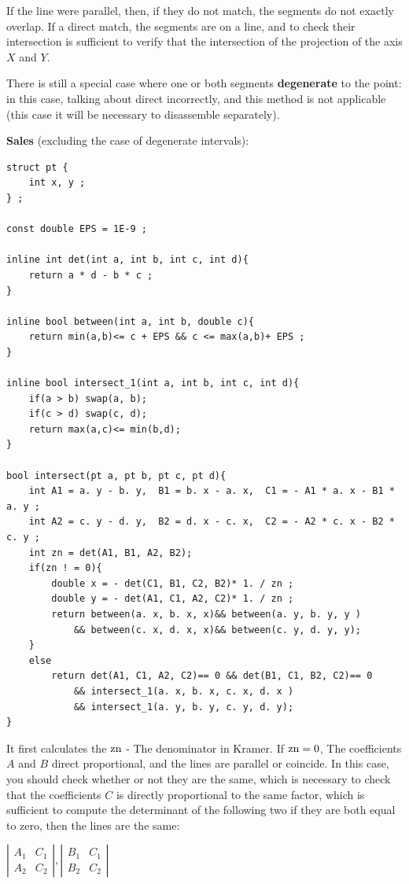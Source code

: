 If the line were parallel, then, if they do not match, the segments do not exactly overlap. If a direct match, the segments are on a line, and to check their intersection is sufficient to verify that the intersection of the projection of the axis $X$ and $Y$.

There is still a special case where one or both segments \textbf{degenerate} to the point: in this case, talking about direct incorrectly, and this method is not applicable (this case it will be necessary to disassemble separately).

\textbf{Sales} (excluding the case of degenerate intervals):

\begin{verbatim}
struct pt {
    int x, y ;
} ;
 
const double EPS = 1E-9 ;
 
inline int det(int a, int b, int c, int d){
    return a * d - b * c ;
}
 
inline bool between(int a, int b, double c){
    return min(a,b)<= c + EPS && c <= max(a,b)+ EPS ;
}
 
inline bool intersect_1(int a, int b, int c, int d){
    if(a > b) swap(a, b);
    if(c > d) swap(c, d);
    return max(a,c)<= min(b,d);
}
 
bool intersect(pt a, pt b, pt c, pt d){
    int A1 = a. y - b. y,  B1 = b. x - a. x,  C1 = - A1 * a. x - B1 * a. y ;
    int A2 = c. y - d. y,  B2 = d. x - c. x,  C2 = - A2 * c. x - B2 * c. y ;
    int zn = det(A1, B1, A2, B2);
    if(zn ! = 0){
        double x = - det(C1, B1, C2, B2)* 1. / zn ;
        double y = - det(A1, C1, A2, C2)* 1. / zn ;
        return between(a. x, b. x, x)&& between(a. y, b. y, y )
            && between(c. x, d. x, x)&& between(c. y, d. y, y);
    }
    else
        return det(A1, C1, A2, C2)== 0 && det(B1, C1, B2, C2)== 0
            && intersect_1(a. x, b. x, c. x, d. x )
            && intersect_1(a. y, b. y, c. y, d. y);
} 
\end{verbatim}
It first calculates the $\rm zn$ - The denominator in Kramer. If ${\rm zn} = 0$, The coefficients $A$ and $B$ direct proportional, and the lines are parallel or coincide. In this case, you should check whether or not they are the same, which is necessary to check that the coefficients $C$ is directly proportional to the same factor, which is sufficient to compute the determinant of the following two if they are both equal to zero, then the lines are the same:

$\left|\begin{array}{cc}
A_{1} & C_{1}\\
A_{2} & C_{2}
\end{array}\right|,\left|\begin{array}{cc}
B_{1} & C_{1}\\
B_{2} & C_{2}
\end{array}\right|$

